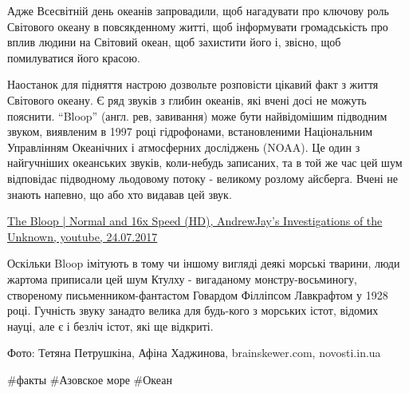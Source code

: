 Адже Всесвітній день океанів запровадили, щоб нагадувати про ключову роль
Світового океану в повсякденному житті, щоб інформувати громадськість про вплив
людини на Світовий океан, щоб захистити його і, звісно, щоб помилуватися його
красою.


Наостанок для підняття настрою дозвольте розповісти цікавий факт з життя
Світового океану. Є ряд звуків з глибин океанів, які вчені досі не можуть
пояснити. \enquote{Bloop} (англ. рев, завивання) може бути найвідомішим підводним
звуком, виявленим в 1997 році гідрофонами, встановленими Національним
Управлінням Океанічних і атмосферних досліджень (NOAA). Це один з найгучніших
океанських звуків, коли-небудь записаних, та в той же час цей шум відповідає
підводному льодовому потоку - великому розлому айсберга. Вчені не знають
напевно, що або хто видавав цей звук.

\href{https://www.youtube.com/watch?v=r7Vnw9qmrf0}{%
The Bloop | Normal and 16x Speed (HD), AndrewJay's Investigations of the Unknown, youtube, 24.07.2017}


Оскільки Bloop імітують в тому чи іншому вигляді деякі морські тварини, люди
жартома приписали цей шум Ктулху - вигаданому монстру-восьминогу, створеному
письменником-фантастом Говардом Філліпсом Лавкрафтом у 1928 році. Гучність
звуку занадто велика для будь-кого з морських істот, відомих науці, але є і
безліч істот, які ще відкриті.

Фото: Тетяна Петрушкіна, Афіна Хаджинова, brainskewer.com, novosti.in.ua

\#факты \#Азовское море \#Океан
